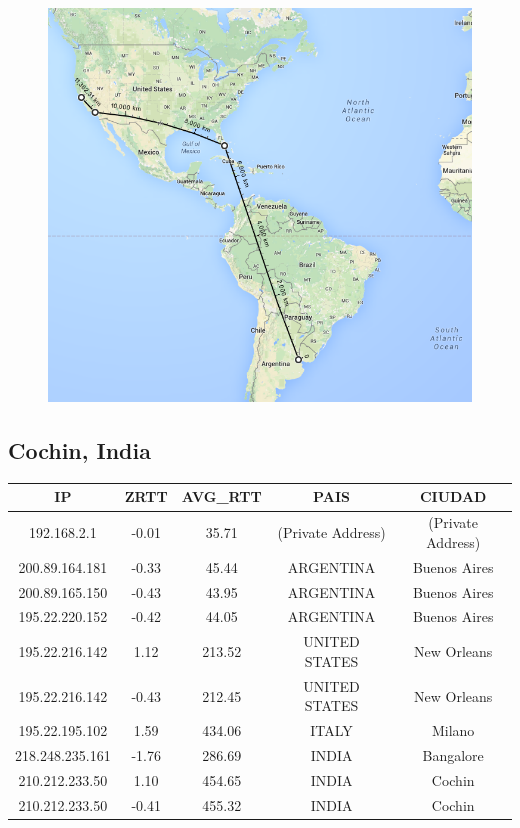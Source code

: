 \begin{figure}[htp]
 \centering
  \includegraphics[width=5in]{imgs/maps/berkeley.png}
\end{figure}

\FloatBarrier
\subsection{Cochin, India}

\begin{tabular}{|c@{\hspace{5ex}}c@{\hspace{5ex}}c@{\hspace{5ex}}c@{\hspace{5ex}}c|}
 \hline
 \rule{0pt}{1.2em}IP & ZRTT & AVG\_RTT & PAIS & CIUDAD\\[0.2em]
 \hline

\rule{0pt}{1.2em} 192.168.2.1  &  -0.01 & 35.71 & (Private Address) & (Private Address) \\[0.2em]
\rule{0pt}{1.2em} 200.89.164.181  &  -0.33 & 45.44 & ARGENTINA & Buenos Aires \\[0.2em]
\rule{0pt}{1.2em} 200.89.165.150  &  -0.43 & 43.95 & ARGENTINA & Buenos Aires \\[0.2em]
\rule{0pt}{1.2em} 195.22.220.152  &  -0.42 & 44.05 & ARGENTINA & Buenos Aires \\[0.2em]
\rule{0pt}{1.2em} 195.22.216.142  &  1.12 & 213.52 & UNITED STATES & New Orleans \\[0.2em]
\rule{0pt}{1.2em} 195.22.216.142  &  -0.43 & 212.45 & UNITED STATES & New Orleans \\[0.2em]
\rule{0pt}{1.2em} 195.22.195.102  &  1.59 & 434.06 & ITALY & Milano \\[0.2em]
\rule{0pt}{1.2em} 218.248.235.161  &  -1.76 & 286.69 & INDIA & Bangalore \\[0.2em]
\rule{0pt}{1.2em} 210.212.233.50  &  1.10 & 454.65 & INDIA & Cochin \\[0.2em]
\rule{0pt}{1.2em} 210.212.233.50  &  -0.41 & 455.32 & INDIA & Cochin \\[0.2em]
\hline
 \end{tabular}

